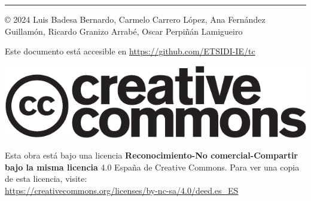 
\chapterprecis{\vfill{}
}
\rule[.5ex]{\linewidth}{1pt} 

© 2024 Luis Badesa Bernardo, Carmelo Carrero López, Ana Fernández Guillamón, Ricardo Granizo Arrabé, Oscar Perpiñán Lamigueiro

Este documento está accesible en \url{https://github.com/ETSIDI-IE/tc}

\begin{center}
\includegraphics[scale=0.5]{../figs/cc-logo}
\par\end{center}

Esta obra está bajo una licencia \textbf{Reconocimiento-No comercial-Compartir
bajo la misma licencia} 4.0 España de Creative Commons. Para ver una
copia de esta licencia, visite:\\
 \url{https://creativecommons.org/licenses/by-nc-sa/4.0/deed.es_ES}

